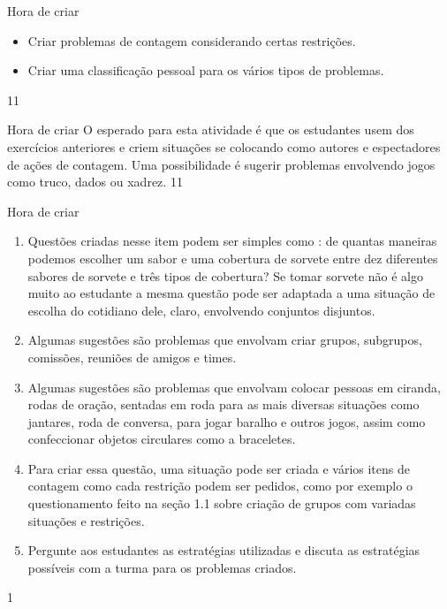 \clearmargin
\def\currentcolor{session2}
\begin{objectives}{Hora de criar}
{
\begin{itemize}
\item Criar problemas de contagem considerando certas restrições.
\item  Criar uma classificação pessoal para os vários tipos de problemas.
\end{itemize}
}{1}{1}
\end{objectives}
\begin{sugestions}{Hora de criar}
{
O esperado para esta atividade é que os estudantes usem dos exercícios anteriores e criem situações se colocando como autores e espectadores de ações de contagem. Uma possibilidade é sugerir problemas envolvendo jogos como truco, dados ou xadrez.
}{1}{1}
\end{sugestions}
\begin{answer}{Hora de criar}
{
\begin{enumerate}
\item Questões criadas nesse item podem ser simples como : de quantas maneiras podemos escolher um sabor e uma cobertura de sorvete entre dez diferentes sabores de sorvete e três tipos de cobertura? Se tomar sorvete não é algo muito ao estudante  a mesma questão pode ser adaptada a uma situação de escolha do cotidiano dele, claro, envolvendo conjuntos disjuntos.
\item Algumas sugestões são problemas que envolvam criar grupos, subgrupos, comissões, reuniões de amigos e times.
\item Algumas sugestões são problemas que envolvam colocar pessoas em ciranda, rodas de oração, sentadas em roda para as mais diversas situações como jantares, roda de conversa, para jogar baralho e outros jogos, assim como confeccionar objetos circulares como a braceletes.
\item Para criar essa questão, uma situação pode ser criada e vários itens de contagem como cada restrição podem ser pedidos, como por exemplo o questionamento feito na seção 1.1 sobre criação de grupos com variadas situações e restrições.
\item Pergunte aos estudantes as estratégias utilizadas e discuta as estratégias possíveis com a turma para os problemas criados. 
\end{enumerate}
}{1}
\end{answer}

